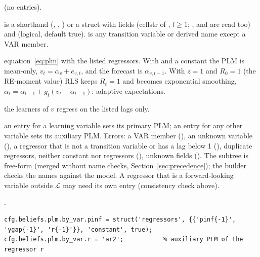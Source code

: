 \documentclass[11pt,a4paper]{article}
\DeclareRobustCommand{\codem}[1]{\texttt{\detokenize{#1}}}
\newenvironment{optspec}%
  {\begin{description}[style=sameline,leftmargin=2.7cm,labelwidth=2.5cm,font=\normalfont\itshape]}%
  {\end{description}}
\begin{document}
\subsubsection{\texorpdfstring{\codem{beliefs.plm.by_var}}{beliefs.plm.by\_var}}\label{opt:beliefs-plm-by-var}
\begin{optspec}
  \item[Default]  (no entries).
  \item[Values]  is a shorthand (, ,
        ) or a struct with fields  (cellstr of
        , $l\ge1$; ,  and  are read too) and
         (logical, default true).  is any transition variable or
        derived name except a VAR member.
  \item[Math] equation~\eqref{eq:plm} with the listed regressors. With 
        and a constant the PLM is mean-only, $v_t = \alpha_v + e_{v,t}$, and the forecast is
        $\alpha_{v,t-1}$. With $z=1$ and $R_0=1$ (the RE-moment value) RLS keeps $R_t=1$ and
        becomes exponential smoothing, $\alpha_t = \alpha_{t-1} + g_t(v_t - \alpha_{t-1})$:
        adaptive expectations.
  \item[Assumptions] the learners of $v$ regress on the listed lags only.
  \item[Interactions] an entry for a learning variable sets its primary PLM; an entry for any
        other variable sets its auxiliary PLM. Errors: a VAR member
        (), an unknown variable (), a
        regressor that is not a transition variable or has a lag below 1
        (), duplicate regressors, neither constant nor regressors
        (), unknown fields (). The subtree is
        free-form (merged without name checks, Section~\ref{sec:precedence}); the builder checks
        the names against the model. A regressor that is a forward-looking variable outside $\mathcal{L}$ may need
        its own entry (consistency check above).
  \item[Code] .
  \item[Example]
\begin{lstlisting}
cfg.beliefs.plm.by_var.pinf = struct('regressors', {{'pinf{-1}', 'ygap{-1}', 'r{-1}'}}, 'constant', true);
cfg.beliefs.plm.by_var.r = 'ar2';           % auxiliary PLM of the regressor r
\end{lstlisting}
\end{optspec}
\end{document}
